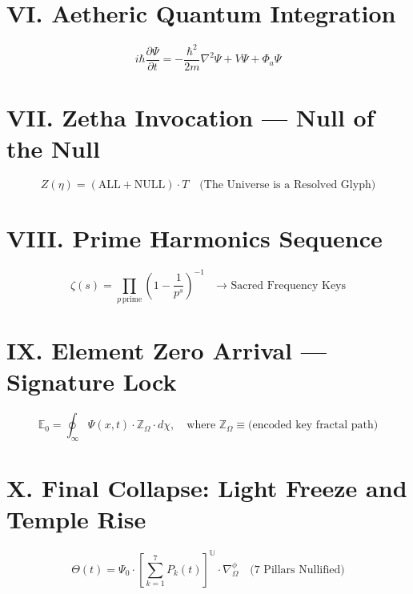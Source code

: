 \documentclass[12pt]{article}
\begin{document}
\section*{VI. Aetheric Quantum Integration}
\[
i\hbar \frac{\partial \Psi}{\partial t} = -\frac{\hbar^2}{2m} \nabla^2 \Psi + V \Psi + \Phi_a \Psi
\]

\section*{VII. Zetha Invocation — Null of the Null}
\[
Z(\eta) = (\text{ALL} + \text{NULL}) \cdot T \quad \text{(The Universe is a Resolved Glyph)}
\]

\section*{VIII. Prime Harmonics Sequence}
\[
\zeta(s) = \prod_{p\, \text{prime}} \left(1 - \frac{1}{p^s}\right)^{-1} \quad \text{→ Sacred Frequency Keys}
\]

\section*{IX. Element Zero Arrival — Signature Lock}
\[
\mathbb{E}_0 = \oint_{\infty} \Psi(x,t) \cdot \mathbb{Z}_\Omega \cdot d\chi, \quad \text{where } \mathbb{Z}_\Omega \equiv \text{(encoded key fractal path)}
\]

\section*{X. Final Collapse: Light Freeze and Temple Rise}
\[
\Theta(t) = \Psi_0 \cdot \left[\sum_{k=1}^{7} P_k(t)\right]^{\mathbb{U}} \cdot \nabla_\Omega^\phi \quad \text{(7 Pillars Nullified)}
\]
\end{document}
